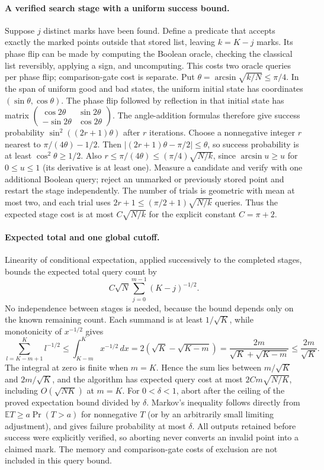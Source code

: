 \documentclass[11pt]{article}
\begin{document}
\paragraph{A verified search stage with a uniform success bound.}
Suppose $j$ distinct marks have been found. Define a predicate that accepts
exactly the marked points outside that stored list, leaving $k=K-j$ marks.
Its phase flip can be made by computing the Boolean oracle, checking the
classical list reversibly, applying a sign, and uncomputing. This costs two
oracle queries per phase flip; comparison-gate cost is separate.
Put $\theta=\arcsin\sqrt{k/N}\le\pi/4$. In the span of uniform good and
bad states, the uniform initial state has coordinates $(\sin\theta,\cos\theta)$.
The phase flip followed by reflection in that initial state has matrix
$\left(\begin{smallmatrix}\cos2\theta&\sin2\theta\\-\sin2\theta&\cos2\theta\end{smallmatrix}\right)$.
The angle-addition formulas therefore give success probability
$\sin^2((2r+1)\theta)$ after $r$ iterations.
Choose a nonnegative integer $r$ nearest to $\pi/(4\theta)-1/2$.
Then $|(2r+1)\theta-\pi/2|\le\theta$, so success probability is at least
$\cos^2\theta\ge1/2$. Also
$r\le\pi/(4\theta)\le(\pi/4)\sqrt{N/k}$, since
$\arcsin u\ge u$ for $0\le u\le1$ (its derivative is at least one).
Measure a candidate and verify with one additional Boolean query; reject an
unmarked or previously stored point and restart the stage independently.
The number of trials is geometric with mean at most two, and each trial uses
$2r+1\le(\pi/2+1)\sqrt{N/k}$ queries. Thus the expected stage cost is at
most $C\sqrt{N/k}$ for the explicit constant $C=\pi+2$.

\paragraph{Expected total and one global cutoff.}
Linearity of conditional expectation, applied successively to the completed
stages, bounds the expected total query count by
\[
C\sqrt N\sum_{j=0}^{m-1}(K-j)^{-1/2}.
\]
No independence between stages is needed, because the bound depends only on
the known remaining count. Each summand is at least $1/\sqrt K$, while
monotonicity of $x^{-1/2}$ gives
\[
\sum_{l=K-m+1}^K l^{-1/2}
\le\int_{K-m}^{K}x^{-1/2}\,dx
=2(\sqrt K-\sqrt{K-m})
=\frac{2m}{\sqrt K+\sqrt{K-m}}
\le\frac{2m}{\sqrt K}.
\]
The integral at zero is finite when $m=K$. Hence the sum lies between
$m/\sqrt K$ and $2m/\sqrt K$, and the algorithm has expected query cost
at most $2Cm\sqrt{N/K}$, including $O(\sqrt{NK})$ at $m=K$.
For $0<\delta<1$, abort after the ceiling of the proved expectation bound
divided by $\delta$. Markov's inequality follows directly from
$\mathbb E T\ge a\Pr(T>a)$ for nonnegative $T$ (or by an arbitrarily
small limiting adjustment), and gives failure probability at most $\delta$.
All outputs retained before success were explicitly verified, so aborting
never converts an invalid point into a claimed mark. The memory and
comparison-gate costs of exclusion are not included in this query bound.
\end{document}

